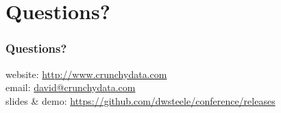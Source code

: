 \section{Questions?}

\begin{frame}
    \frametitle{Questions?}

    website: \url{http://www.crunchydata.com}\\
    \vspace{1em}
    email: \href{mailto:david@crunchydata.com}{david@crunchydata.com}\\
    \vspace{1em}
    slides \& demo: \url{https://github.com/dwsteele/conference/releases}\\
\end{frame}


